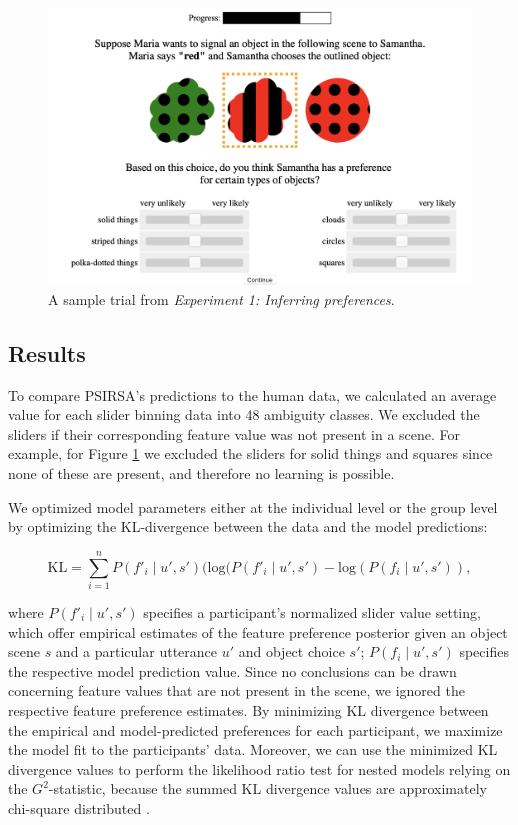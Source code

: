 \documentclass[10pt,a4paper]{article}
\newcommand{\gcs}[1]{\textcolor{blue}{[gcs: #1]}}
\begin{document}
\begin{figure}[ht!]
	\centering
	\includegraphics[width=4.5in]{images/preference-trial.png}
	\caption{A sample trial from \emph{Experiment 1: Inferring preferences}.}\label{exp1-trial}
\end{figure}

\subsection{Results}

To compare PSIRSA's predictions to the human data, we calculated an average value for each slider binning data into 48 ambiguity classes. We excluded the sliders if their corresponding feature value was not present in a scene. For example, for Figure \ref{exp1-trial} we excluded the sliders for solid things and squares since none of these are present, and therefore no learning is possible.

We optimized model parameters either at the individual level or the group level by optimizing the KL-divergence between the data and the model predictions:

$$\textrm{KL} = \sum_{i=1}^{n} P(f'_i\mid u',s') (\textrm {log} (P(f'_i\mid u',s') - \textrm {log} (P(f_i\mid u',s')),$$

where $P(f'_i\mid u',s')$ specifies a participant's normalized slider value setting, which offer empirical estimates of the feature preference posterior given an object scene $s$ and a particular utterance $u'$ and object choice $s'$;
$P(f_i\mid u',s')$ specifies the respective model prediction value. 
Since no conclusions can be drawn concerning feature values that are not present in the scene, we ignored the respective feature preference estimates.
By minimizing KL divergence between the empirical and model-predicted preferences for each participant, we maximize the model fit to the participants' data. 
Moreover, we can use the minimized KL divergence values to perform the likelihood ratio test for nested models relying on the $G^2$-statistic, because the summed KL divergence values are approximately chi-square distributed \cite{Lewandowsky:2011}. 
\end{document}
